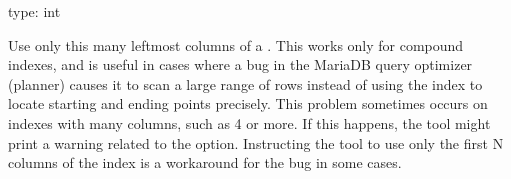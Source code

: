 \documentclass[letterpaper,10pt,english]{sphinxmanual}
\begin{document}

\begin{fulllineitems}
\label{\detokenize{mariadb-schema-change:cmdoption-mariadb-schema-change-chunk-index-columns}}
\sphinxAtStartPar
type: int

\sphinxAtStartPar
Use only this many left\sphinxhyphen{}most columns of a {\hyperref[\detokenize{mariadb-schema-change:cmdoption-mariadb-schema-change-chunk-index}]{}}.  This works
only for compound indexes, and is useful in cases where a bug in the MariaDB
query optimizer (planner) causes it to scan a large range of rows instead
of using the index to locate starting and ending points precisely.  This
problem sometimes occurs on indexes with many columns, such as 4 or more.
If this happens, the tool might print a warning related to the
{\hyperref[\detokenize{mariadb-schema-change:cmdoption-mariadb-schema-change-no-check-plan}]{}} option.  Instructing the tool to use only the first
N columns of the index is a workaround for the bug in some cases.

\end{fulllineitems}

\end{document}

